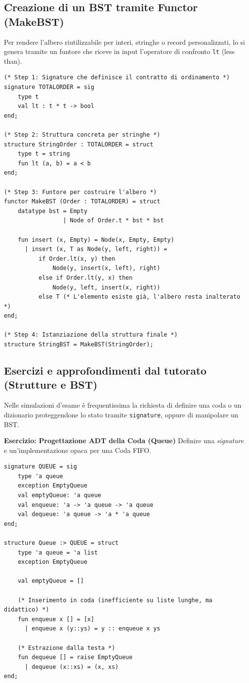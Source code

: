 \documentclass[12pt, a4paper]{article}
\begin{document}
\newpage

\subsection{Creazione di un BST tramite Functor (MakeBST)}

Per rendere l'albero riutilizzabile per interi, stringhe o record personalizzati, lo si genera tramite un funtore che riceve in input l'operatore di confronto \texttt{lt} (less than).

\begin{verbatim}
(* Step 1: Signature che definisce il contratto di ordinamento *)
signature TOTALORDER = sig
    type t
    val lt : t * t -> bool
end;

(* Step 2: Struttura concreta per stringhe *)
structure StringOrder : TOTALORDER = struct
    type t = string
    fun lt (a, b) = a < b
end;

(* Step 3: Funtore per costruire l'albero *)
functor MakeBST (Order : TOTALORDER) = struct
    datatype bst = Empty 
                 | Node of Order.t * bst * bst
                 
    fun insert (x, Empty) = Node(x, Empty, Empty)
      | insert (x, T as Node(y, left, right)) =
          if Order.lt(x, y) then 
              Node(y, insert(x, left), right)
          else if Order.lt(y, x) then 
              Node(y, left, insert(x, right))
          else T (* L'elemento esiste già, l'albero resta inalterato *)
end;

(* Step 4: Istanziazione della struttura finale *)
structure StringBST = MakeBST(StringOrder);
\end{verbatim}

\newpage

\subsection{Esercizi e approfondimenti dal tutorato (Strutture e BST)}

Nelle simulazioni d'esame è frequentissima la richiesta di definire una coda o un dizionario proteggendone lo stato tramite \texttt{signature}, oppure di manipolare un BST.

\textbf{Esercizio: Progettazione ADT della Coda (Queue)}
Definire una \textit{signature} e un'implementazione opaca per una Coda FIFO.
\begin{verbatim}
signature QUEUE = sig
    type 'a queue
    exception EmptyQueue
    val emptyQueue: 'a queue
    val enqueue: 'a -> 'a queue -> 'a queue
    val dequeue: 'a queue -> 'a * 'a queue
end;

structure Queue :> QUEUE = struct
    type 'a queue = 'a list
    exception EmptyQueue
    
    val emptyQueue = []
    
    (* Inserimento in coda (inefficiente su liste lunghe, ma didattico) *)
    fun enqueue x [] = [x]
      | enqueue x (y::ys) = y :: enqueue x ys
      
    (* Estrazione dalla testa *)
    fun dequeue [] = raise EmptyQueue
      | dequeue (x::xs) = (x, xs)
end;
\end{verbatim}
\end{document}
